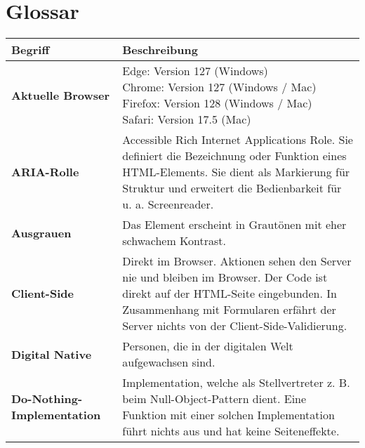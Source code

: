 \chapter*{Glossar}
\label{chap:glossary}

\newcommand{\glossarywithTitle}{0.23\textwidth}
\newcommand{\glossarywith}{0.76\textwidth}

\begin{table}[!ht]
    \centering
    \footnotesize
    \begin{adjustbox}{max width=\textwidth}
        \begin{tabular}{ p{\glossarywithTitle} | p{\glossarywith} }
            \bf{Begriff} & \bf{Beschreibung} \\
            \hline \hline
            \bf{Aktuelle Browser} & \tbbr{
                Edge: Version 127 (Windows) \\
                Chrome: Version 127 (Windows / Mac) \\
                Firefox: Version 128 (Windows / Mac) \\
                Safari: Version 17.5 (Mac)
            } \\
            \hline
            \bf{ARIA-Rolle} & Accessible Rich Internet Applications Role.
                Sie definiert die Bezeichnung oder Funktion eines HTML-Elements.
                Sie dient als Markierung für Struktur und erweitert die Bedienbarkeit für u. a. Screenreader. \\
            \hline
            \bf{Ausgrauen} & Das Element erscheint in Grautönen mit eher schwachem Kontrast. \\
            \hline
            \bf{Client-Side} & Direkt im Browser. 
                Aktionen sehen den Server nie und bleiben im Browser. 
                Der Code ist direkt auf der HTML-Seite eingebunden. 
                In Zusammenhang mit Formularen erfährt der Server nichts von der Client-Side-Validierung. \\
            \hline
            \raggedright \bf{Digital Native} & Personen, die in der digitalen Welt aufgewachsen sind. \\
            \hline
            \raggedright \bf{Do-Nothing-Implementation} & 
                Implementation, welche als Stellvertreter z. B. beim Null-Object-Pattern dient. 
                Eine Funktion mit einer solchen Implementation führt nichts aus und hat keine Seiteneffekte. \\

\end{tabular}
\end{adjustbox}
\end{table}
